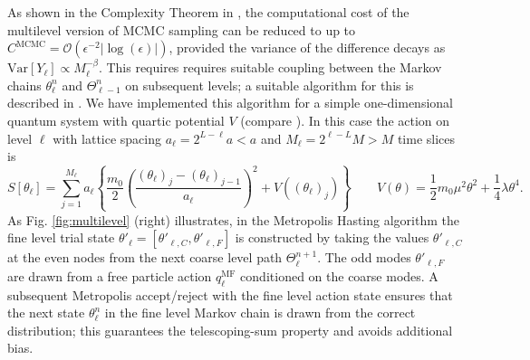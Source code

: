 \documentclass[11pt]{article}
\begin{document}
As shown in the Complexity Theorem in \cite{Dodwell2015}, the computational cost of the multilevel version of MCMC sampling can be reduced to up to $C^{\text{MCMC}}=\mathcal{O}(\epsilon^{-2}|\log(\epsilon)|)$, provided the variance of the difference decays as $\text{Var}[Y_\ell]\propto M_\ell^{-\beta}$. This requires requires suitable coupling between the Markov chains $\theta_\ell^n$ and $\Theta_{\ell-1}^n$ on subsequent levels; a suitable algorithm for this is described in \cite{Dodwell2015}. We have implemented this algorithm for a simple one-dimensional quantum system with quartic potential $V$ (compare \cite{Creutz1981}). In this case the action on level $\ell$ with lattice spacing $a_\ell=2^{L-\ell}a< a$ and $M_\ell=2^{\ell-L}M> M$ time slices is
\begin{equation}
  S\left[\theta_\ell\right] = \sum_{j=1}^{M_\ell} a_\ell\left\{\frac{m_0}{2}\left(\frac{(\theta_\ell)_j-(\theta_\ell)_{j-1}}{a_\ell}\right)^2 + V\left((\theta_\ell)_j\right)\right\}\qquad V(\theta) = \frac{1}{2}m_0\mu^2\theta^2+\frac{1}{4}\lambda\theta^4.\label{eqn:quantum_action}
\end{equation}
As Fig. \ref{fig:multilevel} (right) illustrates, in the Metropolis Hasting algorithm the fine level trial state $\theta'_\ell=[\theta'_{\ell,C},\theta'_{\ell,F}]$ is constructed by taking the values $\theta'_{\ell,C}$ at the even nodes from the next coarse level path $\Theta_\ell^{n+1}$. The odd modes $\theta'_{\ell,F}$ are drawn from a free particle action $q_{\ell}^{\text{MF}}$ conditioned on the coarse modes. A subsequent Metropolis accept/reject with the fine level action state ensures that the next state $\theta_\ell^n$ in the fine level Markov chain is drawn from the correct distribution; this guarantees the telescoping-sum property and avoids additional bias.
\end{document}
